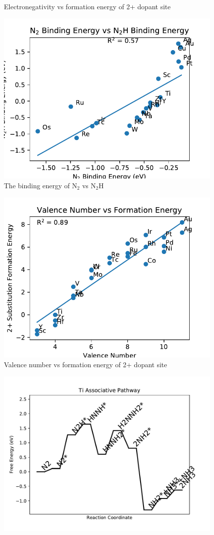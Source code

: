 \begin{figure}
\caption{Electronegativity vs formation energy of 2+ dopant site}
\end{figure}

\begin{figure}
\centering
\includegraphics[width=0.8\linewidth]{Images/N2_vs_N2H.pdf}
\caption{The binding energy of N$_2$ vs N$_2$H}
\end{figure}

\begin{figure}
\centering
\includegraphics[width=0.8\linewidth]{Images/Valence_vs_formation_energy.pdf}
\caption{Valence number vs formation energy of 2+ dopant site}
\end{figure}

\begin{figure}
\includegraphics[width=0.8\linewidth]{data/plots/Ti_associative.pdf}
\end{figure}

